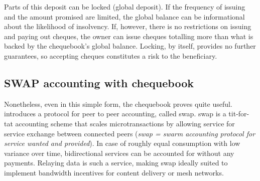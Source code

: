 \documentclass[a4paper,10pt]{article}
\begin{document}
Parts of this deposit can be locked (\gls{global deposit}).
If the frequency of issuing and the amount promised are limited,
the global balance can be informational about the likelihood of insolvency.
If, however, there is no restrictions on issuing and paying out cheques,
the owner can issue cheques totalling more than what is backed
by the chequebook's global balance. Locking, by itself, provides no further guarantees, so accepting
cheques constitutes a risk to the beneficiary.

\subsection{SWAP accounting with chequebook}

Nonetheless, even in this simple form, the chequebook proves quite useful.
\cite{ethersphere2016sw3} introduces a protocol for peer to peer accounting, called \gls{swap}.
\gls{swap} is a tit-for-tat accounting scheme that scales microtransactions by
allowing service for service exchange between connected peers
(\emph{swap = swarm accounting protocol for service wanted and provided}).
In case of roughly equal consumption with low variance over time, bidirectional services
can be accounted for without any payments. Relaying data is such a service, making swap
ideally suited to implement bandwidth incentives for content delivery or mesh networks.
\end{document}
